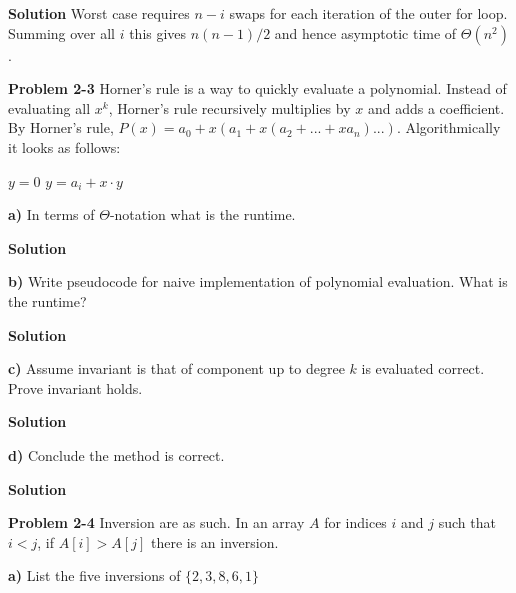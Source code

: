 \documentclass{article}
\begin{document}
\medskip

\textbf{Solution} Worst case requires $n - i$ swaps for each iteration of the outer for loop. Summing over all $i$ this gives $n(n-1)/2$ and hence asymptotic time of $\boxed{\Theta(n^2)}$.

\hrulefill

\textbf{Problem 2-3} Horner's rule is a way to quickly evaluate a polynomial. Instead of evaluating all $x^k$, Horner's rule recursively multiplies by $x$ and adds a coefficient. By Horner's rule, $P(x) = a_0 + x(a_1 + x(a_2 + ... + xa_n)...)$. Algorithmically it looks as follows:

\begin{algorithm}
\begin{algorithmic}[1]
\State $y = 0$
	\State $y = a_i + x \cdot y$
\EndFor
\end{algorithmic}
\end{algorithm}

\medskip

\textbf{a)} In terms of $\Theta$-notation what is the runtime.

\medskip

\textbf{Solution}

\medskip

\textbf{b)} Write pseudocode for naive implementation of polynomial evaluation. What is the runtime?

\medskip

\textbf{Solution}

\medskip

\textbf{c)} Assume invariant is that of component up to degree $k$ is evaluated correct. Prove invariant holds.

\medskip

\textbf{Solution}

\medskip

\textbf{d)} Conclude the method is correct.

\medskip

\textbf{Solution}

\hrulefill

\medskip

\textbf{Problem 2-4} Inversion are as such. In an array $A$ for indices $i$ and $j$ such that $i < j$, if $A[i] > A[j]$ there is an inversion.

\medskip

\textbf{a)} List the five inversions of $\{2,3,8,6,1\}$

\medskip
\end{document}
